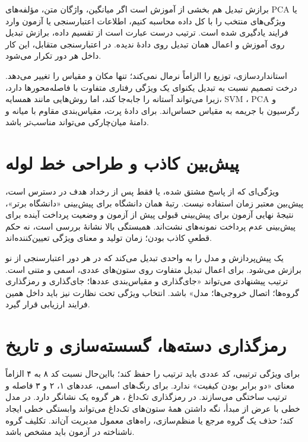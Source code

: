 \begin{important}{برازش تبدیل هم بخشی از آموزش است}
اگر میانگین، واژگان متن، مؤلفه‌های PCA یا ویژگی‌های منتخب را با کل داده محاسبه کنیم، اطلاعات اعتبارسنجی یا آزمون وارد فرایند یادگیری شده است. ترتیب درست عبارت است از تقسیم داده، برازش تبدیل روی آموزش و اعمال همان تبدیل روی دادهٔ ندیده. در اعتبارسنجی متقابل، این کار داخل هر دور تکرار می‌شود.
\end{important}

استانداردسازی، توزیع را الزاماً نرمال نمی‌کند؛ تنها مکان و مقیاس را تغییر می‌دهد. درخت تصمیم نسبت به تبدیل یکنوای یک ویژگی رفتاری متفاوت با فاصله‌محورها دارد، زیرا می‌تواند آستانه را جابه‌جا کند، اما روش‌هایی مانند همسایه، SVM ، PCA و رگرسیون با جریمه به مقیاس حساس‌اند. برای دادهٔ پرت، مقیاس‌بندی مقاوم با میانه و دامنهٔ میان‌چارکی می‌تواند مناسب‌تر باشد.


\section{پیش‌بین کاذب و طراحی خط لوله}
ویژگی‌ای که از پاسخ مشتق شده، یا فقط پس از رخداد هدف در دسترس است، پیش‌بین معتبر زمان استفاده نیست. رتبهٔ همان دانشگاه برای پیش‌بینی «دانشگاه برتر»، نتیجهٔ نهایی آزمون برای پیش‌بینی قبولی پیش از آزمون و وضعیت پرداخت آینده برای پیش‌بینی عدم پرداخت نمونه‌های نشت‌اند. همبستگی بالا نشانهٔ بررسی است، نه حکم قطعیِ کاذب بودن؛ زمان تولید و معنای ویژگی تعیین‌کننده‌اند.

یک  پیش‌پردازش و مدل را به واحدی تبدیل می‌کند که در هر دور اعتبارسنجی از نو برازش می‌شود.  برای اعمال تبدیل متفاوت روی ستون‌های عددی، اسمی و متنی است. ترتیب پیشنهادی می‌تواند «جای‌گذاری و مقیاس‌بندی عددها؛ جای‌گذاری و رمزگذاری گروه‌ها؛ اتصال خروجی‌ها؛ مدل» باشد. انتخاب ویژگی تحت نظارت نیز باید داخل همین فرایند ارزیابی قرار گیرد.

\section{رمزگذاری دسته‌ها، گسسته‌سازی و تاریخ}
برای ویژگی ترتیبی، کد عددی باید ترتیب را حفظ کند؛ بااین‌حال نسبت کد ۸ به ۴ الزاماً معنای «دو برابر بودن کیفیت» ندارد. برای رنگ‌های اسمی، عددهای ۱، ۲ و ۳ فاصله و ترتیب ساختگی می‌سازند. در رمزگذاری تک‌داغ ، هر گروه یک نشانگر دارد. در مدل خطی با عرض از مبدأ، نگه داشتن همهٔ ستون‌های تک‌داغ می‌تواند وابستگی خطی ایجاد کند؛ حذف یک گروه مرجع یا منظم‌سازی، راه‌های معمول مدیریت آن‌اند. تکلیف گروه ناشناخته در آزمون باید مشخص باشد.

